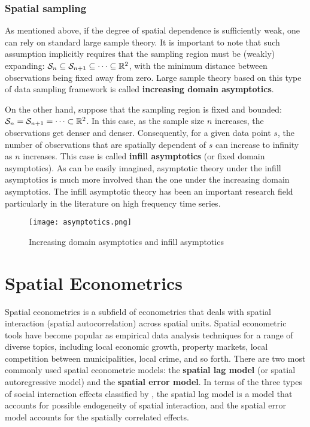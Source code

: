 \documentclass[11pt, A4paper, openany, uplatex]{book}
\begin{document}
\subsection{Spatial sampling}
 
 As mentioned above, if the degree of spatial dependence is sufficiently weak, one can rely on standard large sample theory.
It is important to note that such assumption implicitly requires that the sampling region must be (weakly) expanding: $\mathcal{S}_n \subseteq \mathcal{S}_{n + 1} \subseteq \cdots \subseteq \mathbb{R}^2$, with the minimum distance between observations being fixed away from zero.
Large sample theory based on this type of data sampling framework is called \textbf{increasing domain asymptotics}.

On the other hand, suppose that the sampling region is fixed and bounded:  $\mathcal{S}_n = \mathcal{S}_{n + 1}  = \cdots \subset \mathbb{R}^2$.
In this case, as the sample size $n$ increases, the observations get denser and denser.
Consequently, for a given data point $s$, the number of observations that are spatially dependent of $s$ can increase to infinity as $n$ increases.
This case is called \textbf{infill asymptotics} (or fixed domain asymptotics).
As can be easily imagined, asymptotic theory under the infill asymptotics is much more involved than the one under the increasing domain asymptotics.
The infill asymptotic theory has been an important research field particularly in the literature on high frequency time series.

\begin{figure}[h!]
	\begin{center}
		\texttt{[image: asymptotics.png]}
		\caption{Increasing domain asymptotics and infill asymptotics}
	\end{center}
\end{figure}

\chapter{Spatial Econometrics}\label{chap:spatial_econometrics}

Spatial econometrics is a subfield of econometrics that deals with spatial interaction (spatial autocorrelation) across spatial units.
Spatial econometric tools have become popular as empirical data analysis techniques for a range of diverse topics, including local economic growth, property markets, local competition between municipalities, local crime, and so forth. 
There are two most commonly used spatial econometric models: the \textbf{spatial lag model} (or spatial autoregressive model) and the \textbf{spatial error model}.
In terms of the three types of social interaction effects classified by \cite{manski1993identification}, the spatial lag model is a model that accounts for possible endogeneity of spatial interaction, and the spatial error model accounts for the spatially correlated effects.
\end{document}
